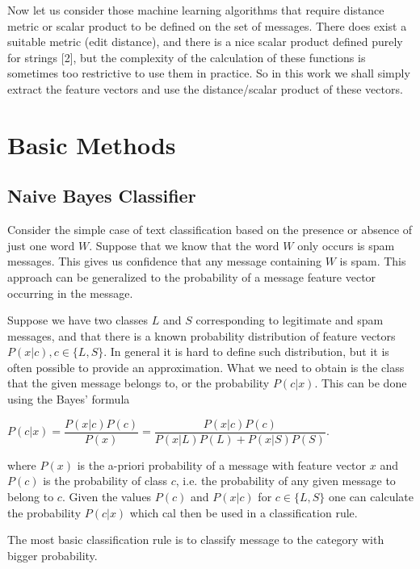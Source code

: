 \documentclass[12pt]{report}
\begin{document}
Now let us consider those machine learning algorithms that require distance metric or scalar product to be defined on the set of messages. There does exist a suitable metric (edit distance), and there is a nice scalar product defined purely for strings [2], but the complexity of the calculation of these functions is sometimes too restrictive to use them in practice. So in this work we shall simply extract the feature vectors and use the distance/scalar product of these vectors.

\newpage


\chapter{Basic Methods}

\section{Naive Bayes Classifier}

Consider the simple case of text classification based on the presence or absence of just one word $W$. Suppose that we know that the word $W$ only occurs is spam messages. This gives us confidence that any message containing $W$ is spam. This approach can be generalized to the probability of a message feature vector occurring in the message.

Suppose we have two classes $L$ and $S$ corresponding to legitimate and spam messages, and that there is a known probability distribution of feature vectors $P(x | c), c \in \{L, S\}$. In general it is hard to define such distribution, but it is often possible to provide an approximation. What we need to obtain is the class that the given message belongs to, or the probability $P(c | x)$. This can be done using the Bayes' formula

\begin{center}
	$P(c | x) = \dfrac{P(x | c) P(c)}{P(x)} = \dfrac{P(x | c) P(c)}{P(x | L) P(L) + P(x | S) P(S)}$.
\end{center}

where $P(x)$ is the a-priori probability of a message with feature vector $x$ and $P(c)$ is the probability of class $c$, i.e. the probability of any given message to belong to $c$. Given the values $P(c)$ and $P(x | c)$ for $c \in \{L, S\}$ one can calculate the probability $P(c | x)$ which cal then be used in a classification rule.

The most basic classification rule is to classify message to the category with bigger probability.
\end{document}
